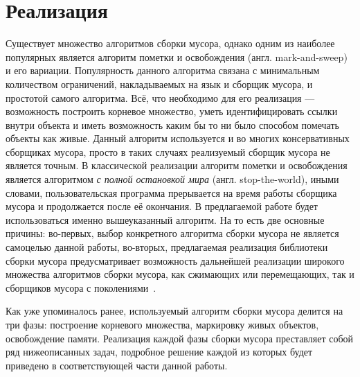\section{Реализация}

Существует множество алгоритмов сборки мусора, однако одним из наиболее популярных является алгоритм пометки и освобождения
(англ. mark-and-sweep) и его вариации. Популярность данного алгоритма связана с минимальным количеством ограничений,
накладываемых на язык и сборщик мусора, и простотой самого алгоритма. Всё, что необходимо для его реализация ---
возможность построить корневое множество, уметь идентифицировать ссылки внутри объекта и иметь возможность
каким бы то ни было способом помечать объекты как живые. Данный алгоритм используется и во многих консервативных
сборщиках мусора, просто в таких случаях реализуемый сборщик мусора не является точным.
В классической реализации алгоритм пометки и освобождения является алгоритмом \textit{с полной остановкой мира}
(англ. stop-the-world),
иными словами, пользовательская программа прерывается на время работы сборщика мусора и продолжается после её окончания.
В предлагаемой работе будет использоваться именно вышеуказанный алгоритм. На то есть две основные причины:
во-первых, выбор конкретного алгоритма сборки мусора не является самоцелью данной работы,
во-вторых, предлагаемая реализация библиотеки сборки мусора предусматривает возможность дальнейшей реализации
широкого множества алгоритмов сборки мусора, как сжимающих или перемещающих, так и сборщиков мусора с
поколениями~\cite{GCHandbook}.

Как уже упоминалось ранее, используемый алгоритм сборки мусора делится на три фазы: построение корневого множества,
маркировку живых объектов, освобождение памяти. Реализация каждой фазы сборки мусора преставляет собой
ряд нижеописанных задач, подробное решение каждой из которых будет приведено в соответствующей части данной работы.

